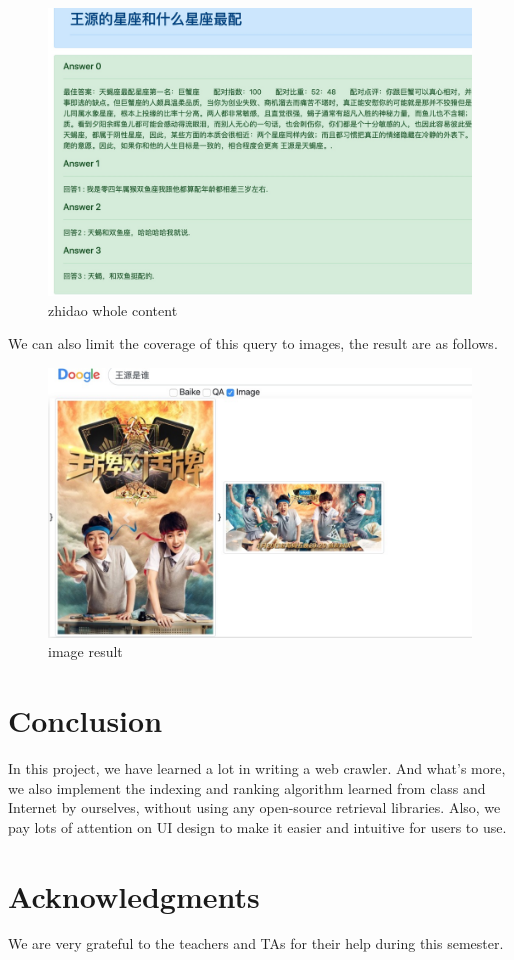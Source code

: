 \documentclass[10pt,times,twocolumn]{article}
\begin{document}
\begin{figure}[!h]
\centering
\includegraphics[scale=0.13]{fig/11}
\caption{zhidao whole content}
\label{fig:label}
\end{figure}
\newline
We can also limit the coverage of this query to images, the result are as follows.
\begin{figure}[h]
\centering
\includegraphics[scale=0.1]{fig/12}
\caption{image result}
\label{fig:label}
\end{figure}

\section{Conclusion}
In this project, we have learned a lot in writing a web crawler. And what's more, we also implement the indexing 
and ranking algorithm learned from class and Internet by ourselves, without using any open-source retrieval libraries. 
Also, we pay lots of attention on UI design to make it easier and intuitive for users to use.
\section{Acknowledgments}
We are very grateful to the teachers and TAs for their help during this semester. 

% 
% 
\end{document}
